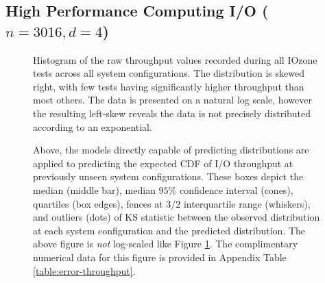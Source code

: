 \documentclass[smallextended,final]{svjour3}       %
\begin{document}
\subsection{High Performance Computing I/O ($n = 3016, d = 4$)}

\begin{figure}
  \centering
  \caption{Histogram of the raw throughput values recorded during all
    IOzone tests across all system configurations. The distribution is
    skewed right, with few tests having significantly higher
    throughput than most others. The data is presented on a natural
    log scale, however the resulting left-skew reveals the data is not
    precisely distributed according to an exponential.}
  \label{fig:hist-throughput}
\end{figure}

\begin{figure}
  \centering
  \caption{Above, the models directly capable of predicting
    distributions are applied to predicting the expected CDF of I/O
    throughput at previously unseen system configurations. These
    boxes depict the median (middle bar), median $95\%$ confidence
    interval (cones), quartiles (box edges), fences at $3/2$
    interquartile range (whiskers), and outliers (dots) of KS
    statistic between the observed distribution at each system
    configuration and the predicted distribution. The above figure is
    \textit{not} log-scaled like Figure \ref{fig:hist-throughput}. The
    complimentary numerical data for this figure is provided in
    Appendix Table \ref{table:error-throughput}.}
  \label{fig:error-throughput}
\end{figure}
\end{document}
